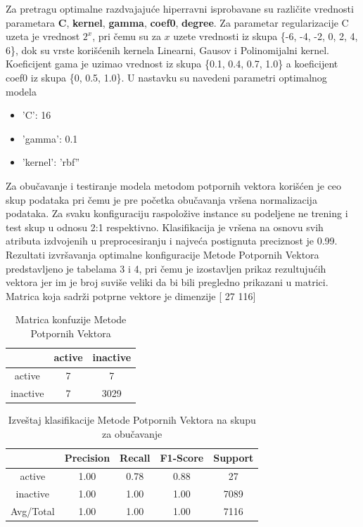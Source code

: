\documentclass[12pt]{article}
\begin{document}
Za pretragu optimalne razdvajajuće hiperravni isprobavane su različite vrednosti parametara {\bf C},  {\bf kernel},  {\bf gamma},  {\bf coef0},  {\bf degree}. Za parametar regularizacije C uzeta je vrednost $2^x$, pri čemu su za $x$ uzete vrednosti iz skupa \{-6, -4, -2, 0, 2, 4, 6\}, dok su vrste korišćenih kernela Linearni, Gausov i Polinomijalni kernel. Koeficijent gama je uzimao vrednost iz skupa  \{0.1, 0.4, 0.7, 1.0\} a koeficijent coef0 iz skupa \{0, 0.5, 1.0\}. U nastavku su navedeni parametri optimalnog modela 

\begin{itemize}

	\item 'C': 16
	\item 'gamma': 0.1
	\item 'kernel': 'rbf''

\end{itemize}


Za obučavanje i testiranje modela metodom potpornih vektora korišćen je ceo skup podataka pri čemu je pre početka obučavanja vršena normalizacija podataka. Za svaku konfiguraciju raspoložive instance su podeljene ne trening i test skup u odnosu 2:1 respektivno. Klasifikacija je vršena na osnovu svih atributa izdvojenih u preprocesiranju i najveća postignuta preciznost je 0.99. Rezultati izvršavanja optimalne konfiguracije Metode Potpornih Vektora predstavljeno je tabelama 3 i 4, pri čemu je izostavljen prikaz rezultujućih vektora jer im je broj suviše veliki da bi bili pregledno prikazani u matrici. Matrica koja sadrži potprne vektore je dimenzije  [ 27 116]

\begin{table}[h]
\caption{Matrica konfuzije Metode Potpornih Vektora}
\centering
\begin{tabular}{|c|c|c|}
        	\hline
	& active & inactive \\
        	\hline
	active & 7 & 7 \\
	\hline
        	inactive & 7 & 3029  \\
	\hline
\end{tabular}
\end{table}


\begin{table}[h]
\caption{Izveštaj klasifikacije Metode Potpornih Vektora na skupu za obučavanje}
\centering
\begin{tabular}{|c|c|c|c|c|}
        	\hline
	& Precision & Recall & F1-Score & Support \\
        	\hline
	active & 1.00 & 0.78 & 0.88 & 27 \\
        	\hline
	inactive & 1.00 & 1.00 & 1.00 & 7089 \\
        	\hline
	Avg/Total & 1.00 & 1.00 & 1.00 & 7116 \\
	\hline
\end{tabular}
\end{table}
\end{document}
